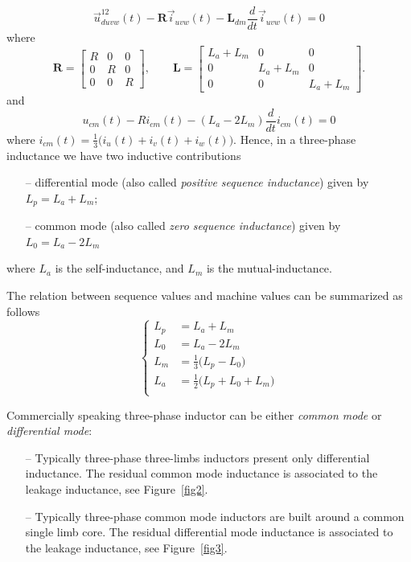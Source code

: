 \documentclass[11pt,a4paper]{scrartcl}
\numberwithin{equation}{section}
\theoremstyle{it}
\theoremstyle{definition}
\begin{document}
\begin{onehalfspace}
	\begin{equation}
		\vec{u}_{duvw}^{12}(t) - \mathbf{R}\vec{i}_{uvw}(t) - \mathbf{L}_{dm}\frac{d}{dt}\vec{i}_{uvw}(t) = 0
	\end{equation}
	where
	\begin{equation}
		\mathbf{R} = \begin{bmatrix} R & 0 & 0 \\ 0 & R & 0 \\ 0 & 0 & R \end{bmatrix}, \qquad 
		\mathbf{L} = \begin{bmatrix} L_a+L_m & 0 & 0 \\ 0 & L_a+L_m & 0 \\ 0 & 0 & L_a+L_m \end{bmatrix}.
	\end{equation}
	and 
	\begin{equation}
		{u}_{cm}(t) - R {i}_{cm}(t) - (L_a-2L_m)\frac{d}{dt}{i}_{cm}(t) = 0
	\end{equation}
	where ${i}_{cm}(t) = \frac{1}{3}\Big(i_u(t)+i_v(t)+i_w(t)\Big)$.
	Hence, in a three-phase inductance we have two inductive contributions
	\begin{itemize}
		\item[--] differential mode (also called \textit{positive sequence inductance}) given by $L_p = L_a + L_m$;
		\item[--] common mode (also called \textit{zero sequence inductance}) given by $L_0 = L_a -2L_m$
	\end{itemize}
	where $L_a$ is the self-inductance, and $L_m$ is the mutual-inductance.
	
	The relation between sequence values and machine values can be summarized as follows
	\begin{equation}\left\lbrace 
		\begin{aligned}
			L_p &= L_a + L_m \\[6pt]
			L_0 &= L_a -2L_m  \\[6pt]
			L_m &= \frac{1}{3}\Big(L_p - L_0\Big) \\[6pt]
			L_a &= \frac{1}{2}\Big(L_p + L_0 + L_m\Big) \\[6pt]
		\end{aligned}\right. 
	\end{equation}
	
	Commercially speaking three-phase inductor can be either \textit{common mode} or \textit{differential mode}:
	\begin{itemize}
		\item[--] Typically three-phase three-limbs inductors present only differential inductance. The residual common mode inductance is associated to the leakage inductance, see Figure~\ref{fig2}.
		\item[--] Typically three-phase common mode inductors are built around a common single limb core. The residual differential mode inductance is associated to the leakage inductance, see Figure~\ref{fig3}.
	\end{itemize}
	

\end{onehalfspace}
\end{document}
